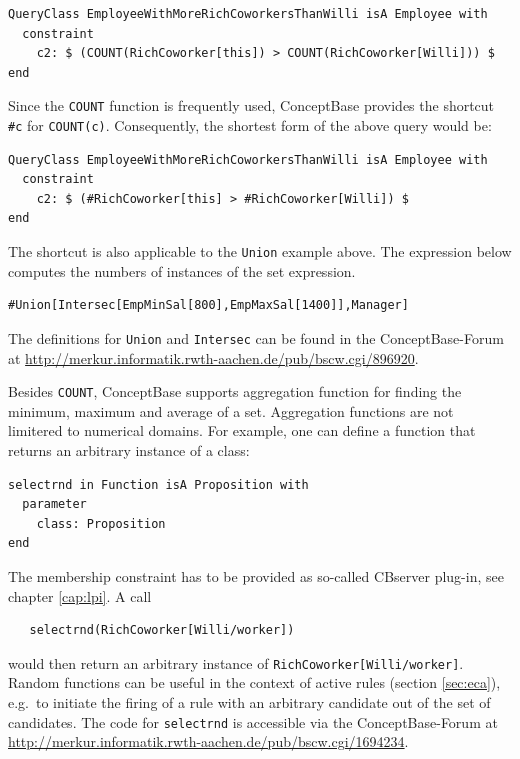 {\small
\begin{verbatim}
QueryClass EmployeeWithMoreRichCoworkersThanWilli isA Employee with
  constraint
    c2: $ (COUNT(RichCoworker[this]) > COUNT(RichCoworker[Willi])) $
end
\end{verbatim}
}

Since the {\tt COUNT} function is frequently used, ConceptBase provides the
shortcut {\tt \#c} for {\tt COUNT(c)}. Consequently, the shortest form of the
above query would be:

{\small
\begin{verbatim}
QueryClass EmployeeWithMoreRichCoworkersThanWilli isA Employee with
  constraint
    c2: $ (#RichCoworker[this] > #RichCoworker[Willi]) $
end
\end{verbatim}
}

The shortcut is also applicable to the {\tt Union} example above. The
expression below computes the numbers of instances of the set expression.

\begin{verbatim}
#Union[Intersec[EmpMinSal[800],EmpMaxSal[1400]],Manager]
\end{verbatim}

The definitions for {\tt Union} and {\tt Intersec}  can be found in
the ConceptBase-Forum at
\url{http://merkur.informatik.rwth-aachen.de/pub/bscw.cgi/896920}.

Besides {\tt COUNT}, ConceptBase supports aggregation function for
finding the minimum, maximum and average of a set. Aggregation functions are
not limitered to numerical domains. For example, one can define a function
that returns an arbitrary instance of a class:

{\small
\begin{verbatim}
selectrnd in Function isA Proposition with
  parameter
    class: Proposition
end
\end{verbatim}
}

The membership constraint has to be provided as so-called CBserver plug-in, see chapter 
\ref{cap:lpi}.
A call 
\begin{verbatim}
   selectrnd(RichCoworker[Willi/worker])
\end{verbatim}
would then return an arbitrary instance
of {\tt RichCoworker[Willi/worker]}. Random functions can be useful in the context
of active rules (section \ref{sec:eca}), e.g.\ to initiate the firing of a 
rule with an arbitrary candidate out of the set of candidates.
The code for {\tt selectrnd} is accessible via the ConceptBase-Forum at
\url{http://merkur.informatik.rwth-aachen.de/pub/bscw.cgi/1694234}.


